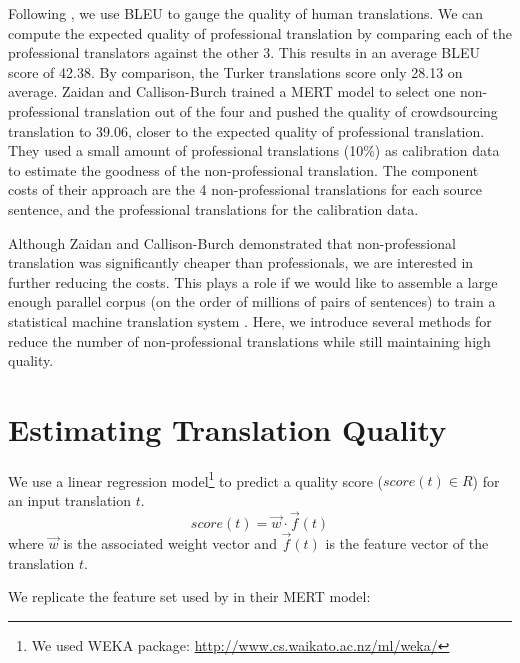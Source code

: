 \documentclass[11pt,letterpaper]{article}
\begin{document}
Following , we use BLEU \cite{papineni2002bleu} to gauge the quality of human translations.  We can compute the expected quality of professional translation by comparing each of the professional translators against the other 3.  This results in an average BLEU score of  42.38.  By comparison, the Turker translations score only 28.13 on average. Zaidan and Callison-Burch trained a MERT model to select one non-professional translation out of the four and pushed the quality of crowdsourcing translation to 39.06, closer to the expected quality of professional translation. They used a small amount of professional translations (10\%) as calibration data to estimate the goodness of the non-professional translation. The component costs of their approach are the 4 non-professional translations for each source sentence, and the professional translations for the calibration data.

Although Zaidan and Callison-Burch demonstrated that non-professional translation was significantly cheaper than professionals, we are interested in further reducing the costs.  This plays a role if we would like to assemble a large enough parallel corpus (on the order of millions of pairs of sentences) to train a statistical machine translation system \cite{ambati2010can,post2012constructing,zbib2012machine,zbib2013systematic}. Here, we introduce several methods for reduce the number of non-professional translations  while still maintaining high quality. 



\section{Estimating Translation Quality}

We use a linear regression model\footnote{We used WEKA package: \url{http://www.cs.waikato.ac.nz/ml/weka/}} to predict a quality score ($ score(t) \in R$) for an input translation $t$.
\[ score(t) = \vec{w}  \cdot \vec f(t) \]
  where $\vec{w}$ is the associated weight vector and $\vec f(t)$ is the feature vector of the translation $t$. 

We replicate the feature set used by  in their MERT model:
\end{document}
